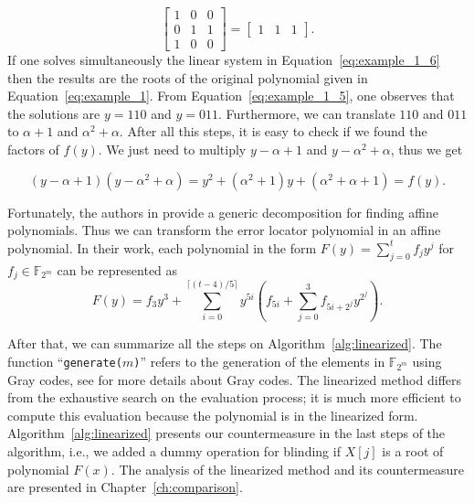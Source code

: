 \begin{example}
\begin{equation}
    \begin{bmatrix}
    1 & 0 & 0 \\
    0 & 1 & 1 \\
    1 & 0 & 0
    \end{bmatrix}
    =
    \begin{bmatrix} 1 & 1 & 1 \end{bmatrix}.
\end{equation}
If one solves simultaneously the linear system in Equation~\ref{eq:example_1_6} then the results are the roots of the original polynomial given in Equation~\ref{eq:example_1}. From Equation~\ref{eq:example_1_5}, one observes that the solutions are $y=110$ and $y=011$. Furthermore, we can translate $110$ and $011$ to $\alpha + 1$ and $\alpha^2 + \alpha$. After all this steps, it is easy to check if we found the factors of $f(y)$. We just need to multiply $y - \alpha + 1$ and $y- \alpha^2 + \alpha$, thus we get

\begin{equation*}\label{eq:example_1_7}
    (y - \alpha + 1) (y - \alpha^2 + \alpha) = y^2 + (\alpha^2+1)y + (\alpha^2 +\alpha +1) = f(y).
\end{equation*}
\end{example}

Fortunately, the authors in \cite{fedorenko2002finding} provide a generic decomposition for finding affine polynomials. Thus we can transform the error locator polynomial in an affine polynomial. In their work, each polynomial in the form $F(y) = \sum_{j=0}^{t} f_jy^j$ for $f_j \in \mathbb{F}_{2^m}$ can be represented as
\begin{equation}
\label{eq:f_y}
    F(y) = f_3y^3 + \sum_{i=0}^{\lceil (t-4)/5 \rceil} y^{5i}(f_{5i} + \sum_{j=0}^{3} f_{5i+2^j}y^{2^j}).
\end{equation}

After that, we can summarize all the steps on Algorithm~\ref{alg:linearized}. The function ``\texttt{generate($m$)}'' refers to the generation of the elements in $\mathbb{F}_{2^m}$ using Gray codes, see \cite{savage1997survey} for more details about Gray codes. The linearized method differs from the exhaustive search on the evaluation process; it is much more efficient to compute this evaluation because the polynomial is in the linearized form. Algorithm~\ref{alg:linearized} presents our countermeasure in the last steps of the algorithm, i.e., we added a dummy operation for blinding if $X[j]$ is a root of polynomial $F(x)$. The analysis of the linearized method and its countermeasure are presented in Chapter~\ref{ch:comparison}.

